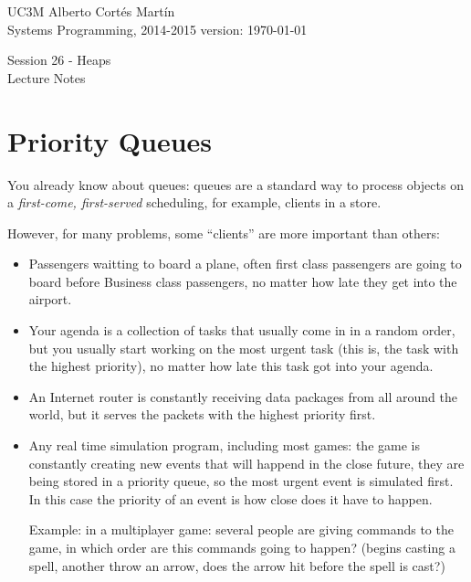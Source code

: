\documentclass[a4paper, 9pt]{extarticle}
\newcommand{\realtitle}{Session 26 - Heaps}
\begin{document}
\makebox[\linewidth]{\rule{\textwidth}{0.4pt}}
UC3M \hfill Alberto Cortés Martín\\
Systems Programming, 2014-2015 \hfill version: \today\\
\makebox[\linewidth]{\rule{\textwidth}{0.4pt}}
\begin{center}
  \Large{\realtitle}\\Lecture Notes
\end{center}
\makebox[\linewidth]{\rule{\textwidth}{0.4pt}}
\vspace{1cm}


\section{Priority Queues}

You already know about queues: queues are a standard way to process objects on
a \emph{first-come, first-served} scheduling, for example, clients in a store.

However, for many problems, some ``clients'' are more important than others:

\begin{itemize}

  \item Passengers waitting to board a plane, often first class passengers are
    going to board before Business class passengers, no matter how late they
    get into the airport.

  \item Your agenda is a collection of tasks that usually come in in a random
    order, but you usually start working on the most urgent task (this is, the
    task with the highest priority), no matter how late this task got into your
    agenda.

  \item An Internet router is constantly receiving data packages from all
    around the world, but it serves the packets with the highest priority
    first.

  \item Any real time simulation program, including most games: the game is
    constantly creating new events that will happend in the close future, they
    are being stored in a priority queue, so the most urgent event is simulated
    first. In this case the priority of an event is how close does it have to
    happen.

    Example: in a multiplayer game: several people are giving commands to the
    game, in which order are this commands going to happen? (begins casting a
    spell, another throw an arrow, does the arrow hit before the spell is
    cast?)

\end{itemize}
\end{document}
